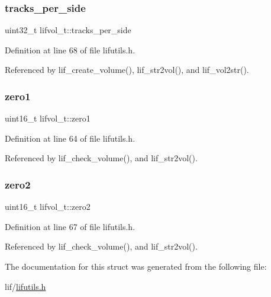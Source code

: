 \subsubsection{\texorpdfstring{tracks\+\_\+per\+\_\+side}{tracks\_per\_side}}
{\footnotesize\ttfamily uint32\+\_\+t lifvol\+\_\+t\+::tracks\+\_\+per\+\_\+side}



Definition at line 68 of file lifutils.\+h.



Referenced by lif\+\_\+create\+\_\+volume(), lif\+\_\+str2vol(), and lif\+\_\+vol2str().

\mbox{\label{structlifvol__t_a5e749ae4bff79deaa813966cff04f431}} 
\subsubsection{\texorpdfstring{zero1}{zero1}}
{\footnotesize\ttfamily uint16\+\_\+t lifvol\+\_\+t\+::zero1}



Definition at line 64 of file lifutils.\+h.



Referenced by lif\+\_\+check\+\_\+volume(), and lif\+\_\+str2vol().

\mbox{\label{structlifvol__t_ac05fef8e2c908110de7083d7afbfdb37}} 
\subsubsection{\texorpdfstring{zero2}{zero2}}
{\footnotesize\ttfamily uint16\+\_\+t lifvol\+\_\+t\+::zero2}



Definition at line 67 of file lifutils.\+h.



Referenced by lif\+\_\+check\+\_\+volume(), and lif\+\_\+str2vol().



The documentation for this struct was generated from the following file\+:\begin{DoxyCompactItemize}
\item 
lif/\hyperlink{lifutils_8h}{lifutils.\+h}\end{DoxyCompactItemize}
